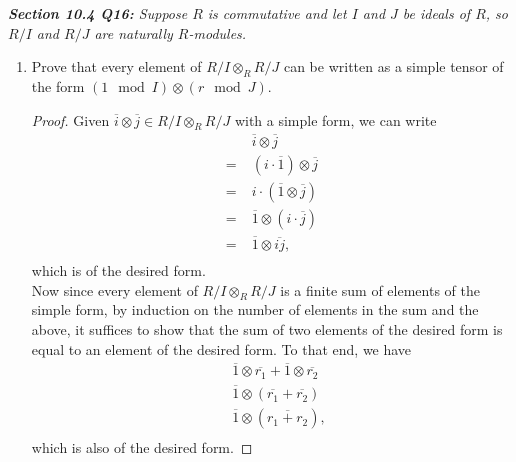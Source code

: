 \documentclass{article}
\begin{document}
\it \textbf{Section 10.4 Q16:} Suppose $R$ is commutative and let $I$ and
  $J$ be ideals of $R$, so $R/I$ and $R/J$ are naturally $R$-modules.
  \begin{enumerate}[label={(\alph*)}]
    \item Prove that every element of $R/I\otimes_R R/J$ can be written as
      a simple tensor of the form $(1\mod{I})\otimes(r\mod{J})$.
      \begin{proof}
        Given $\overline{i}\otimes\overline{j} \in R/I\otimes_R R/J$ with a
        simple form, we can write
        \begin{align*}
          &\;\overline{i}\otimes\overline{j}\\
          =&\;(i\cdot\overline{1})\otimes\overline{j}\\
          =&\;i\cdot(\overline{1}\otimes\overline{j})\\
          =&\;\overline{1}\otimes(i\cdot\overline{j})\\
          =&\;\overline{1}\otimes\overline{ij},\\
        \end{align*}
        which is of the desired form. \\

        Now since every element of $R/I\otimes_R R/J$ is a finite sum of
        elements of the simple form, by induction on the number of elements
        in the sum and the above, it suffices to show that the sum of two
        elements of the desired form is equal to an element of the desired
        form. To that end, we have
        \begin{align*}
          &\;\overline{1}\otimes\overline{r_1}
            +\overline{1}\otimes\overline{r_2}\\
          &\;\overline{1}\otimes (\overline{r_1}+\overline{r_2})\\
          &\;\overline{1}\otimes (\overline{r_1+r_2}),\\
        \end{align*}
        which is also of the desired form.
      \end{proof}
  \end{enumerate}
\end{document}
